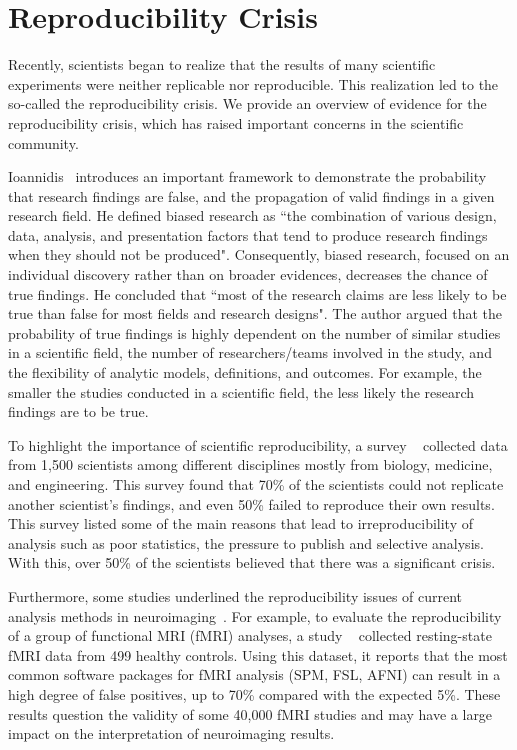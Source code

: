 \section{Reproducibility Crisis}

Recently, scientists began to realize that the results of many 
scientific experiments were neither replicable nor reproducible. This 
realization led to the so-called the reproducibility crisis. 
We provide an overview of evidence for the
reproducibility crisis, which has raised important concerns in the 
scientific community.

Ioannidis~\cite{ioannidis2005most} introduces an important framework to 
demonstrate the probability that research findings are false, and the 
propagation of valid findings in a given research field. He defined 
biased research as ``the combination of various design, data, analysis, 
and presentation factors that tend to produce research findings when 
they should not be produced". Consequently, biased research, focused on 
an individual discovery rather than on broader evidences, decreases the 
chance of true findings. He concluded that ``most of the research 
claims are less likely to be true than false for most fields and 
research designs". The author argued that the probability of true 
findings is highly dependent on the number of similar studies in a 
scientific field, the number of researchers/teams involved in the study, 
and the flexibility of analytic models, definitions, and outcomes. For 
example, the smaller the studies conducted in a scientific field, the 
less likely the research findings are to be true. 

To highlight the importance of scientific reproducibility, a survey ~\cite{baker20161}
collected data from 1,500 scientists among 
different disciplines mostly from  biology, medicine, and engineering. 
This survey found that 70\% of the scientists could not 
replicate another scientist's findings, and even 50\% failed to 
reproduce their own results. This survey listed some of 
the main reasons that lead to irreproducibility of analysis 
such as poor statistics, the pressure to publish 
and selective analysis. 
With this, over 50\% of the scientists believed that there was a 
significant crisis.

Furthermore, some studies underlined the reproducibility issues of 
current analysis methods in neuroimaging~\cite{jovicich2009mri, 
muller2017altered, eklund2016cluster}. For example, to evaluate 
the reproducibility of a group of functional MRI (fMRI) analyses, a study 
~\cite{eklund2016cluster} collected resting-state fMRI data from 499 
healthy controls. Using this dataset, it reports that the most common 
software packages for fMRI analysis (SPM, FSL, AFNI) can result in a 
high degree of false positives, up to 70\% compared with the expected 
5\%. These results question the validity of some 40,000 fMRI studies 
and may have a large impact on the interpretation of neuroimaging 
results. 

